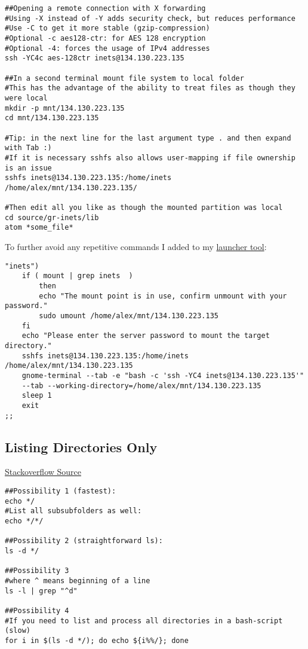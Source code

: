 \documentclass{article}
\begin{document}
\begin{verbatim}
##Opening a remote connection with X forwarding
#Using -X instead of -Y adds security check, but reduces performance
#Use -C to get it more stable (gzip-compression)
#Optional -c aes128-ctr: for AES 128 encryption
#Optional -4: forces the usage of IPv4 addresses
ssh -YC4c aes-128ctr inets@134.130.223.135

##In a second terminal mount file system to local folder
#This has the advantage of the ability to treat files as though they were local
mkdir -p mnt/134.130.223.135
cd mnt/134.130.223.135

#Tip: in the next line for the last argument type . and then expand with Tab :)
#If it is necessary sshfs also allows user-mapping if file ownership is an issue
sshfs inets@134.130.223.135:/home/inets /home/alex/mnt/134.130.223.135/

#Then edit all you like as though the mounted partition was local
cd source/gr-inets/lib
atom *some_file*

\end{verbatim}

To further avoid any repetitive commands I added to my \href{http://alexander-pastor.de/convenient-linux-game-launcher/}{launcher tool}:

\begin{verbatim}
"inets")
	if ( mount | grep inets  )
		then
		echo "The mount point is in use, confirm unmount with your password."
		sudo umount /home/alex/mnt/134.130.223.135
	fi
	echo "Please enter the server password to mount the target directory."
	sshfs inets@134.130.223.135:/home/inets /home/alex/mnt/134.130.223.135
	gnome-terminal --tab -e "bash -c 'ssh -YC4 inets@134.130.223.135'" 
	--tab --working-directory=/home/alex/mnt/134.130.223.135
	sleep 1
	exit
;;
\end{verbatim}

\subsection{Listing Directories Only}

\href{https://stackoverflow.com/questions/14352290/listing-only-directories-using-ls-in-bash-an-examination}{Stackoverflow Source}

\begin{verbatim}
##Possibility 1 (fastest):
echo */
#List all subsubfolders as well:
echo */*/

##Possibility 2 (straightforward ls):
ls -d */

##Possibility 3
#where ^ means beginning of a line
ls -l | grep "^d"

##Possibility 4
#If you need to list and process all directories in a bash-script (slow)
for i in $(ls -d */); do echo ${i%%/}; done
\end{verbatim}
\end{document}
